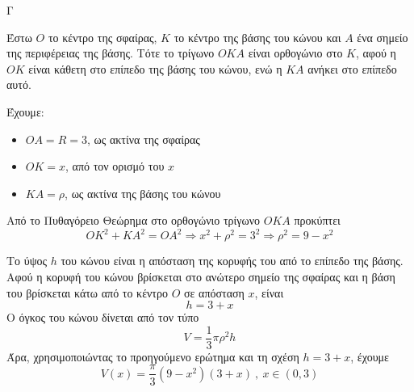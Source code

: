 \begin{thema}{Γ}
\begin{erwthma}
\item Έστω $O$ το κέντρο της σφαίρας, $K$ το κέντρο της βάσης του κώνου και $A$ ένα σημείο της περιφέρειας της βάσης.
Τότε το τρίγωνο $OKA$ είναι ορθογώνιο στο $K$, αφού η $OK$ είναι κάθετη στο επίπεδο της βάσης του κώνου, ενώ η $KA$ ανήκει στο επίπεδο αυτό.

Έχουμε:
\begin{itemize}
\item $OA=R=3$, ως ακτίνα της σφαίρας
\item $OK=x$, από τον ορισμό του $x$
\item $KA=\rho$, ως ακτίνα της βάσης του κώνου
\end{itemize}
Από το Πυθαγόρειο Θεώρημα στο ορθογώνιο τρίγωνο $OKA$ προκύπτει
\[OK^2+KA^2=OA^2\Rightarrow x^2+\rho^2=3^2\Rightarrow \rho^2=9-x^2\]

\item Το ύψος $h$ του κώνου είναι η απόσταση της κορυφής του από το επίπεδο της βάσης.
Αφού η κορυφή του κώνου βρίσκεται στο ανώτερο σημείο της σφαίρας και η βάση του βρίσκεται κάτω από το κέντρο $O$ σε απόσταση $x$, είναι
\[h=3+x\]
Ο όγκος του κώνου δίνεται από τον τύπο
\[V=\frac{1}{3}\pi\rho^2h\]
Άρα, χρησιμοποιώντας το προηγούμενο ερώτημα και τη σχέση $h=3+x$, έχουμε
\[V(x)=\frac{\pi}{3}(9-x^2)(3+x)\ ,\ x\in(0,3)\]


\end{erwthma}
\end{thema}
